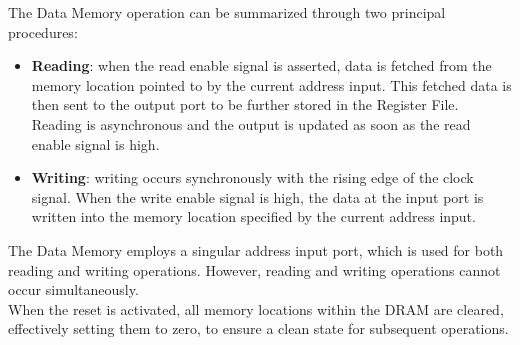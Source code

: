 The Data Memory operation can be summarized through two principal procedures:
\begin{itemize}
	\item \textbf{Reading}: when the read enable signal is asserted, data is fetched from the memory location pointed to by the current address input. This fetched data is then sent to the output port to be further stored in the Register File. Reading is asynchronous and the output is updated as soon as the read enable signal is high.
  
	\item \textbf{Writing}: writing occurs synchronously with the rising edge of the clock signal. When the write enable signal is high, the data at the input port is written into the memory location specified by the current address input.
\end{itemize}

The Data Memory employs a singular address input port, which is used for both reading and writing operations. However, reading and writing operations cannot occur simultaneously. \\

When the reset is activated, all memory locations within the DRAM are cleared, effectively setting them to zero, to ensure a clean state for subsequent operations.

